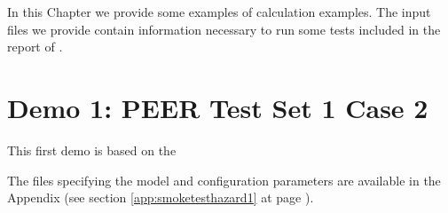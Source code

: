 In this Chapter we provide some examples of calculation examples. The 
input files we provide contain information necessary to run some tests
included in the report of \citet{thomas2010}.
%

%
\section{Demo 1: PEER Test Set 1 Case 2}
This first demo is based on the 

The files specifying the model and configuration parameters are 
available in the Appendix (see section \ref{app:smoketesthazard1}
at page \pageref{app:smoketesthazard1}).

